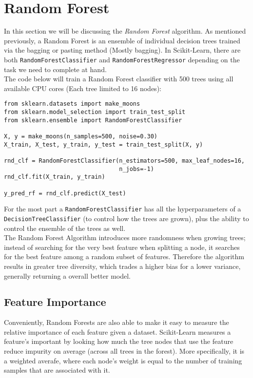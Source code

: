 
\section{Random Forest}

In this section we will be discussing the \textit{Random Forest} algorithm. As mentioned previously, a Random Forest is an ensemble 
of individual decision trees trained via the bagging or pasting method (Mostly bagging). In Scikit-Learn, there are both 
\texttt{RandomForestClassifier} and \texttt{RandomForestRegressor} depending on the task we need to complete at 
hand. \\

\noindent
The code below will train a Random Forest classifier with 500 trees using all available CPU cores (Each tree limited to 16 nodes):

\begin{verbatim}
from sklearn.datasets import make_moons
from sklearn.model_selection import train_test_split
from sklearn.ensemble import RandomForestClassifier

X, y = make_moons(n_samples=500, noise=0.30)
X_train, X_test, y_train, y_test = train_test_split(X, y)

rnd_clf = RandomForestClassifier(n_estimators=500, max_leaf_nodes=16, 
                                 n_jobs=-1)
rnd_clf.fit(X_train, y_train)

y_pred_rf = rnd_clf.predict(X_test)
\end{verbatim}

\noindent
For the most part a \texttt{RandomForestClassifier} has all the hyperparameters of a \texttt{DecisionTreeClassifier}
(to control how the trees are grown), plus the ability to control the ensemble of the trees as well. \\

\noindent
The Random Forest Algorithm introduces more randomness when growing trees; instead of searching for the very best feature when splitting
a node, it searches for the best feature among a random subset of features. Therefore the algorithm results in greater tree diversity, 
which trades a higher bias for a lower variance, generally returning a overall better model. 

\subsection{Feature Importance}

Conveniently, Random Forests are also able to make it easy to measure the relative importance of each feature given a dataset. Scikit-Learn
measures a feature's important by looking how much the tree nodes that use the feature reduce impurity on average (across all trees in the
forest). More specifically, it is a weighted averafe, where each node's weight is equal to the number of training samples that are 
associated with it. \\

